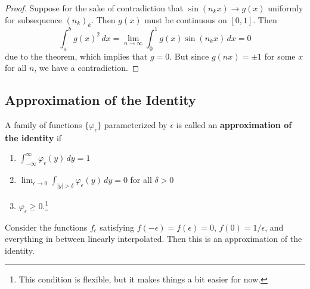   \begin{theorem}
    
  \end{theorem}
  \begin{proof}
    Suppose for the sake of contradiction that $\sin(n_k x) \to g(x)$ uniformly for subsequence $(n_k)_k$. Then $g(x)$ must be continuous on $[0, 1]$. Then 
    \begin{equation} 
      \int_a^b g(x)^2 \,dx = \lim_{n \to \infty} \int_0^1 g(x) \sin(n_k x) \,dx = 0
    \end{equation}
    due to the theorem, which implies that $g = 0$. But since $g(nx) = \pm 1$ for some $x$ for all $n$, we have a contradiction. 
  \end{proof}

\subsection{Approximation of the Identity} 

  \begin{definition}
    A family of functions $\{\varphi_\epsilon\}$ parameterized by $\epsilon$ is called an \textbf{approximation of the identity} if 
    \begin{enumerate}
      \item $\int_{-\infty}^{\infty} \varphi_\epsilon (y) \,dy = 1$ 
      \item $\lim_{\epsilon \to 0} \int_{|y| > \delta} \varphi_\epsilon (y) \,dy = 0$ for all $\delta > 0$ 
      \item $\varphi_\epsilon \geq 0$.\footnote{This condition is flexible, but it makes things a bit easier for now.}
    \end{enumerate}
  \end{definition}

  \begin{example}
    Consider the functions $f_\epsilon$ satisfying $f(-\epsilon) = f(\epsilon) = 0$, $f(0) = 1/\epsilon$, and everything in between linearly interpolated. Then this is an approximation of the identity. 
  \end{example}

